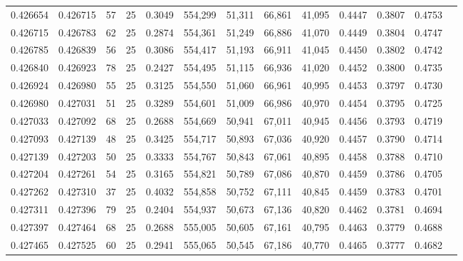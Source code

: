 \begin{tabular}{rrrrrrrrrrrrr}
0.426654 & 0.426715 &    57 &  25 &                                     0.3049 & 554,299 &  51,311 &  66,861 &  41,095 & 0.4447 & 0.3807 & 0.4753 \\
0.426715 & 0.426783 &    62 &  25 &                                     0.2874 & 554,361 &  51,249 &  66,886 &  41,070 & 0.4449 & 0.3804 & 0.4747 \\
0.426785 & 0.426839 &    56 &  25 &                                     0.3086 & 554,417 &  51,193 &  66,911 &  41,045 & 0.4450 & 0.3802 & 0.4742 \\
0.426840 & 0.426923 &    78 &  25 &                                     0.2427 & 554,495 &  51,115 &  66,936 &  41,020 & 0.4452 & 0.3800 & 0.4735 \\
0.426924 & 0.426980 &    55 &  25 &                                     0.3125 & 554,550 &  51,060 &  66,961 &  40,995 & 0.4453 & 0.3797 & 0.4730 \\
0.426980 & 0.427031 &    51 &  25 &                                     0.3289 & 554,601 &  51,009 &  66,986 &  40,970 & 0.4454 & 0.3795 & 0.4725 \\
0.427033 & 0.427092 &    68 &  25 &                                     0.2688 & 554,669 &  50,941 &  67,011 &  40,945 & 0.4456 & 0.3793 & 0.4719 \\
0.427093 & 0.427139 &    48 &  25 &                                     0.3425 & 554,717 &  50,893 &  67,036 &  40,920 & 0.4457 & 0.3790 & 0.4714 \\
0.427139 & 0.427203 &    50 &  25 &                                     0.3333 & 554,767 &  50,843 &  67,061 &  40,895 & 0.4458 & 0.3788 & 0.4710 \\
0.427204 & 0.427261 &    54 &  25 &                                     0.3165 & 554,821 &  50,789 &  67,086 &  40,870 & 0.4459 & 0.3786 & 0.4705 \\
0.427262 & 0.427310 &    37 &  25 &                                     0.4032 & 554,858 &  50,752 &  67,111 &  40,845 & 0.4459 & 0.3783 & 0.4701 \\
0.427311 & 0.427396 &    79 &  25 &                                     0.2404 & 554,937 &  50,673 &  67,136 &  40,820 & 0.4462 & 0.3781 & 0.4694 \\
0.427397 & 0.427464 &    68 &  25 &                                     0.2688 & 555,005 &  50,605 &  67,161 &  40,795 & 0.4463 & 0.3779 & 0.4688 \\
0.427465 & 0.427525 &    60 &  25 &                                     0.2941 & 555,065 &  50,545 &  67,186 &  40,770 & 0.4465 & 0.3777 & 0.4682 \\

\end{tabular}
